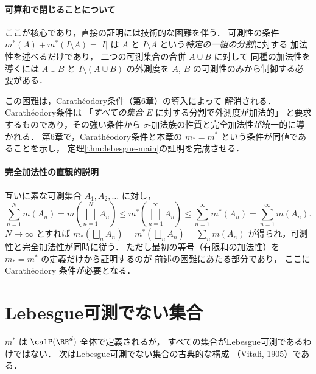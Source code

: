 \paragraph{可算和で閉じることについて}
ここが核心であり，直接の証明には技術的な困難を伴う．
可測性の条件 $m^*(A) + m^*(I \setminus A) = |I|$ は
$A$ と $I \setminus A$ という\emph{特定の一組の分割}に対する
加法性を述べるだけであり，
二つの可測集合の合併 $A \cup B$ に対して
同種の加法性を導くには
$A \cup B$ と $I \setminus (A \cup B)$ の外測度を
$A$, $B$ の可測性のみから制御する必要がある．

この困難は，Carath\'eodory条件（第6章）の導入によって
解消される．
Carath\'eodory条件は
「\emph{すべての集合} $E$ に対する分割で外測度が加法的」
と要求するものであり，その強い条件から
$\sigma$-加法族の性質と完全加法性が統一的に導かれる．
第6章で，Carath\'eodory条件と本章の
$m_* = m^*$ という条件が同値であることを示し，
定理\ref{thm:lebesgue-main}の証明を完成させる．

\paragraph{完全加法性の直観的説明}
互いに素な可測集合 $A_1, A_2, \ldots$ に対し，
\[
\sum_{n=1}^{N} m(A_n)
= m\!\left(\bigsqcup_{n=1}^{N} A_n\right)
\le m^*\!\left(\bigsqcup_{n=1}^{\infty} A_n\right)
\le \sum_{n=1}^{\infty} m^*(A_n)
= \sum_{n=1}^{\infty} m(A_n).
\]
$N \to \infty$ とすれば
$m_*(\bigsqcup_n A_n) = m^*(\bigsqcup_n A_n) = \sum_n m(A_n)$
が得られ，可測性と完全加法性が同時に従う．
ただし最初の等号（有限和の加法性）を
$m_* = m^*$ の定義だけから証明するのが
前述の困難にあたる部分であり，
ここに Carath\'eodory 条件が必要となる．

\section{Lebesgue可測でない集合}\label{sec:non-measurable}

$m^*$ は $\calP(\RR^d)$ 全体で定義されるが，
すべての集合がLebesgue可測であるわけではない．
次はLebesgue可測でない集合の古典的な構成
（Vitali, 1905）である．

